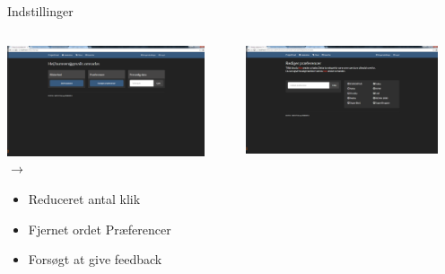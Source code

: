 \begin{frame}{Indstillinger}
	
	\begin{minipage}[0.3\textheight]{\textwidth}
	\begin{columns}[T]
	\begin{column}{0.5\textwidth}
	 \includegraphics[width=0.9\textwidth,height=0.8\textheight,keepaspectratio]{images/Screenshots/SettingsOld.png} \vspace{2 mm} $\rightarrow$ 
	 
	 \begin{itemize}
	 	\item Reduceret antal klik
	 	\item Fjernet ordet Præferencer
	 	\item Forsøgt at give feedback
	 \end{itemize}
	 
	\end{column}
	\begin{column}{0.5\textwidth}
	 \includegraphics[width=0.9\textwidth,height=0.8\textheight,keepaspectratio]{images/Screenshots/SettingsOld2.png}
	 
	 \vspace{2 mm}
	  

\end{column}
\end{columns}
\end{minipage}
\end{frame}
